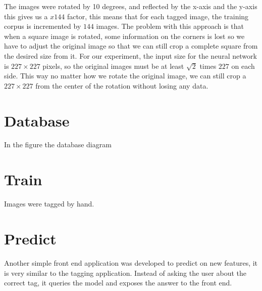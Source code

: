 The images were rotated by 10 degrees, and reflected by the x-axis and the y-axis this gives us a $x144$ factor, this means that for each tagged image, the training corpus is incremented by $144$ images. The problem with this approach is that when a square image is rotated, some information on the corners is lost so we have to adjust the original image so that we can still crop a complete square from the desired size from it. For our experiment, the input size for the neural network is $227\times 227$ pixels, so the original images must be at least $\sqrt{2}$ times $227$ on each side. This way no matter how we rotate the original image, we can still crop a $227\times 227$ from the center of the rotation without losing any data.\\

\section{Database}

In the figure the database diagram

\begin{figure}[h]
  \begin{center}
  \end{center}
\end{figure}

\section{Train}

Images were tagged by hand.

\section{Predict}

Another simple front end application was developed to predict on new features, it is very similar to the tagging application. Instead of asking the user about the correct tag, it queries the model and exposes the answer to the front end.\\

